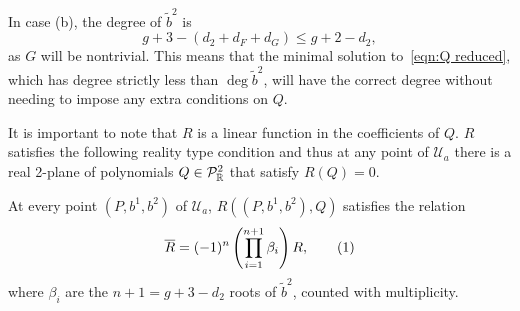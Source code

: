 \documentclass{article}
\begin{document}
In case (b), the degree of $\tilde{b}^2$ is
\[
g+3 - (d_2 + d_F + d_G) \leq g + 2 - d_2,
\]
as $G$ will be nontrivial. This means that the minimal solution to~\eqref{eqn:Q reduced}, which has degree strictly less than $\deg \tilde{b}^2$, will have the correct degree without needing to impose any extra conditions on $Q$.

It is important to note that $R$ is a linear function in the coefficients of $Q$. $R$ satisfies the following reality type condition and thus at any point of $\mathcal{U}_{a}$ there is a real 2-plane of polynomials $Q\in\mathcal{P}^2_{\mathbb{R}}$ that satisfy $R(Q) = 0$.

\begin{lem}
At every point $(P,b^1,b^2)$ of $\mathcal{U}_{a}$, $R((P,b^1,b^2), Q)$ satisfies the relation
\[
\bar{R} = (-1)^{n}\bra{ \prod_{i=1}^{n+1}  \beta_i }  R,
\labelthis{eqn:R reality}
\]
where $\beta_i$ are the $n+1 = g+3 - d_2$ roots of $\tilde{b}^2$, counted with multiplicity.


\end{lem}
\end{document}
